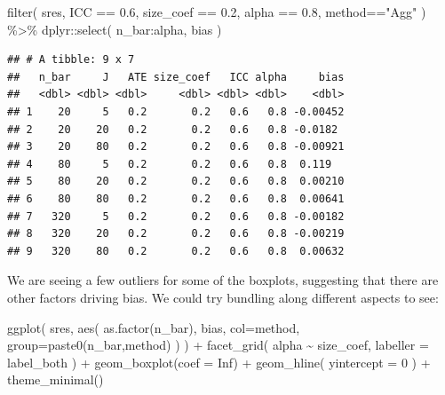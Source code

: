 \documentclass[
]{book}
\newenvironment{Shaded}{\begin{snugshade}}{\end{snugshade}}
\newcommand{\AttributeTok}[1]{\textcolor[rgb]{0.77,0.63,0.00}{#1}}
\newcommand{\ConstantTok}[1]{\textcolor[rgb]{0.00,0.00,0.00}{#1}}
\newcommand{\DecValTok}[1]{\textcolor[rgb]{0.00,0.00,0.81}{#1}}
\newcommand{\FloatTok}[1]{\textcolor[rgb]{0.00,0.00,0.81}{#1}}
\newcommand{\FunctionTok}[1]{\textcolor[rgb]{0.00,0.00,0.00}{#1}}
\newcommand{\NormalTok}[1]{#1}
\newcommand{\SpecialCharTok}[1]{\textcolor[rgb]{0.00,0.00,0.00}{#1}}
\newcommand{\StringTok}[1]{\textcolor[rgb]{0.31,0.60,0.02}{#1}}
\begin{document}
\begin{Shaded}
\begin{Highlighting}[]
\FunctionTok{filter}\NormalTok{( sres, ICC }\SpecialCharTok{==} \FloatTok{0.6}\NormalTok{, size\_coef }\SpecialCharTok{==} \FloatTok{0.2}\NormalTok{,}
\NormalTok{        alpha }\SpecialCharTok{==} \FloatTok{0.8}\NormalTok{, method}\SpecialCharTok{==}\StringTok{"Agg"}\NormalTok{ ) }\SpecialCharTok{\%\textgreater{}\%}
\NormalTok{  dplyr}\SpecialCharTok{::}\FunctionTok{select}\NormalTok{( n\_bar}\SpecialCharTok{:}\NormalTok{alpha, bias )}
\end{Highlighting}
\end{Shaded}

\begin{verbatim}
## # A tibble: 9 x 7
##   n_bar     J   ATE size_coef   ICC alpha     bias
##   <dbl> <dbl> <dbl>     <dbl> <dbl> <dbl>    <dbl>
## 1    20     5   0.2       0.2   0.6   0.8 -0.00452
## 2    20    20   0.2       0.2   0.6   0.8 -0.0182 
## 3    20    80   0.2       0.2   0.6   0.8 -0.00921
## 4    80     5   0.2       0.2   0.6   0.8  0.119  
## 5    80    20   0.2       0.2   0.6   0.8  0.00210
## 6    80    80   0.2       0.2   0.6   0.8  0.00641
## 7   320     5   0.2       0.2   0.6   0.8 -0.00182
## 8   320    20   0.2       0.2   0.6   0.8 -0.00219
## 9   320    80   0.2       0.2   0.6   0.8  0.00632
\end{verbatim}

We are seeing a few outliers for some of the boxplots, suggesting that there are other factors driving bias. We could try bundling along different aspects to see:

\begin{Shaded}
\begin{Highlighting}[]
\FunctionTok{ggplot}\NormalTok{( sres, }\FunctionTok{aes}\NormalTok{( }\FunctionTok{as.factor}\NormalTok{(n\_bar), bias, }\AttributeTok{col=}\NormalTok{method, }\AttributeTok{group=}\FunctionTok{paste0}\NormalTok{(n\_bar,method) ) ) }\SpecialCharTok{+}
  \FunctionTok{facet\_grid}\NormalTok{( alpha }\SpecialCharTok{\textasciitilde{}}\NormalTok{  size\_coef, }\AttributeTok{labeller =}\NormalTok{ label\_both ) }\SpecialCharTok{+}
  \FunctionTok{geom\_boxplot}\NormalTok{(}\AttributeTok{coef =} \ConstantTok{Inf}\NormalTok{) }\SpecialCharTok{+}
  \FunctionTok{geom\_hline}\NormalTok{( }\AttributeTok{yintercept =} \DecValTok{0}\NormalTok{ ) }\SpecialCharTok{+}
  \FunctionTok{theme\_minimal}\NormalTok{()}
\end{Highlighting}
\end{Shaded}
\end{document}
